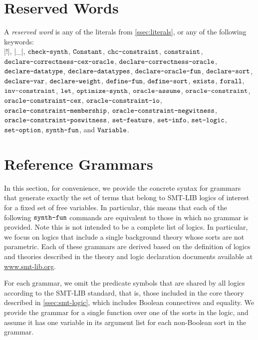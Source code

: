 \documentclass[english,a4paper,10pt]{article}
\begin{document}



\newpage
\begin{appendix}

\section{Reserved Words}%
\label{apx:reserved}

A \emph{reserved word} is any of the 
literals from \cref{ssec:literals},
or any of the following keywords:\\
\code|!|,
\code|_|,
$\texttt{check-synth}$,
$\texttt{Constant}$,
$\texttt{chc-constraint}$,
$\texttt{constraint}$,
$\texttt{declare-correctness-cex-oracle}$,
$\texttt{declare-correctness-oracle}$,
$\texttt{declare-datatype}$,
$\texttt{declare-datatypes}$,
$\texttt{declare-oracle-fun}$,
$\texttt{declare-sort}$,
$\texttt{declare-var}$,
$\texttt{declare-weight}$,
$\texttt{define-fun}$,
$\texttt{define-sort}$,
$\texttt{exists}$,
$\texttt{forall}$,
$\texttt{inv-constraint}$,
$\texttt{let}$,
$\texttt{optimize-synth}$,
$\texttt{oracle-assume}$,
$\texttt{oracle-constraint}$,
$\texttt{oracle-constraint-cex}$,
$\texttt{oracle-constraint-io}$,
$\texttt{oracle-constraint-membership}$,
$\texttt{oracle-constraint-negwitness}$,
$\texttt{oracle-constraint-poswitness}$,
$\texttt{set-feature}$,
$\texttt{set-info}$,
$\texttt{set-logic}$,
$\texttt{set-option}$,
$\texttt{synth-fun}$, and
$\texttt{Variable}$.


\section{Reference Grammars}%
\label{apx:ref-grammars}

In this section, for convenience, we provide the concrete syntax for
grammars that generate exactly the set of terms 
that belong to SMT-LIB logics of interest for a fixed set of free variables.
In particular, this means that each of the following $\texttt{synth-fun}$
commands are equivalent to those in which no grammar is provided.
Note this is not intended to be a complete list of logics.
In particular, we focus on logics that include a single background theory
whose sorts are not parametric.
Each of these grammars are derived
based on the definition of logics and theories
described in the theory and logic declaration documents
available at \url{www.smt-lib.org}.

For each grammar, we omit 
the predicate symbols that are shared by all logics
according to the SMT-LIB standard, that is,
those included in the core theory described in \cref{ssec:smt-logic},
which includes Boolean connectives and equality.
We provide the grammar
for a single function over one of the sorts in the logic,
and assume it has one variable in its argument list
for each non-Boolean sort in the grammar.


\end{appendix}
\end{document}
